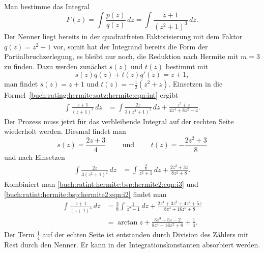 \begin{beispiel}
Man bestimme das Integral
\[
F(z)
=
\int \frac{p(z)}{q(z)} \,dz
=
\int \frac{z+1}{(z^2+1)^3} \,dz.
\]
Der Nenner liegt bereits in der quadratfreien Faktorisierung mit dem
Faktor $q(z)=z^2+1$ vor, somit hat der Integrand bereits die Form der
Partialbruchzerlegung, es bleibt nur noch, die Reduktion nach Hermite 
mit $m=3$ zu finden.
Dazu werden zunächst $s(z)$ und $t(z)$ bestimmt mit
\[
s(z)q(z) + t(z)q'(z) = z+1,
\]
man findet $s(z)=z+1$ und $t(z)=-\frac12(z^2+z)$.
Einsetzen in die Formel~\eqref{buch:rating:hermite:satz:hermite:eqn:int}
ergibt
\begin{align}
\int
\frac{z+1}{(z+1)^3}
\,dz
&=
\int \frac{2z}{3(z^2+1)^2} \,dz
+
\frac{z^2+z}{4z^4+8z^2+4}.
\label{buch:ratint:hermite:bsp:hermite2:eqn:i3}
\end{align}
Der Prozess muss jetzt für das verbleibende Integral auf der rechten
Seite wiederholt werden.
Diesmal findet man
\[
s(z)=\frac{2z+3}{4}
\qquad\text{ und }\qquad
t(z)=-\frac{2z^2+3}{8}
\]
und nach Einsetzen
\begin{align}
\int \frac{2z}{3(z^2+1)^2} \,dz
&=
\int \frac{\frac{3}{8}}{z^2+1}\,dz
+
\frac{2z^2+3z}{8z^2+8}.
\label{buch:ratint:hermite:bsp:hermite2:eqn:i2}
\end{align}
Kombiniert man
\eqref{buch:ratint:hermite:bsp:hermite2:eqn:i3}
und
\eqref{buch:ratint:hermite:bsp:hermite2:eqn:i2}
findet man
\begin{align*}
\int
\frac{z+1}{(z+1)^3}\,dz
&=
\frac38 \int \frac{1}{z^2+1}\,dz
+
\frac{2z^4+3z^3+4z^2+5z}{8z^4+16z^2+8}
\\
&=
\arctan z
+ 
\frac{3z^3+5z-2}{8z^4+16z^2+8}
+\frac14.
\end{align*}
Der Term $\frac14$ auf der echten Seite ist entstanden durch Division
des Zählers mit Rest durch den Nenner.
Er kann in der Integrationskonstanten absorbiert werden.
\end{beispiel}
